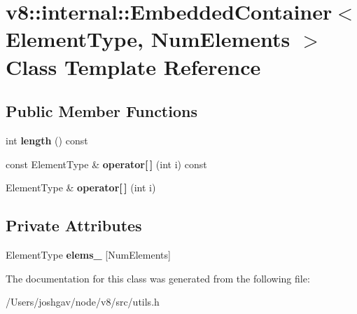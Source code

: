 \hypertarget{classv8_1_1internal_1_1_embedded_container}{}\section{v8\+:\+:internal\+:\+:Embedded\+Container$<$ Element\+Type, Num\+Elements $>$ Class Template Reference}
\label{classv8_1_1internal_1_1_embedded_container}
\subsection*{Public Member Functions}
\begin{DoxyCompactItemize}
\item 
int {\bfseries length} () const \hypertarget{classv8_1_1internal_1_1_embedded_container_a4974384f3a7533af4314498377d153d0}{}\label{classv8_1_1internal_1_1_embedded_container_a4974384f3a7533af4314498377d153d0}

\item 
const Element\+Type \& {\bfseries operator\mbox{[}$\,$\mbox{]}} (int i) const \hypertarget{classv8_1_1internal_1_1_embedded_container_a25cb752548c298f0f2659e04aa9da9dc}{}\label{classv8_1_1internal_1_1_embedded_container_a25cb752548c298f0f2659e04aa9da9dc}

\item 
Element\+Type \& {\bfseries operator\mbox{[}$\,$\mbox{]}} (int i)\hypertarget{classv8_1_1internal_1_1_embedded_container_a30ea902e600baaf5e21457d790102f8f}{}\label{classv8_1_1internal_1_1_embedded_container_a30ea902e600baaf5e21457d790102f8f}

\end{DoxyCompactItemize}
\subsection*{Private Attributes}
\begin{DoxyCompactItemize}
\item 
Element\+Type {\bfseries elems\+\_\+} \mbox{[}Num\+Elements\mbox{]}\hypertarget{classv8_1_1internal_1_1_embedded_container_a46acf24d958a13b592ebbab1de991ec9}{}\label{classv8_1_1internal_1_1_embedded_container_a46acf24d958a13b592ebbab1de991ec9}

\end{DoxyCompactItemize}


The documentation for this class was generated from the following file\+:\begin{DoxyCompactItemize}
\item 
/\+Users/joshgav/node/v8/src/utils.\+h\end{DoxyCompactItemize}

